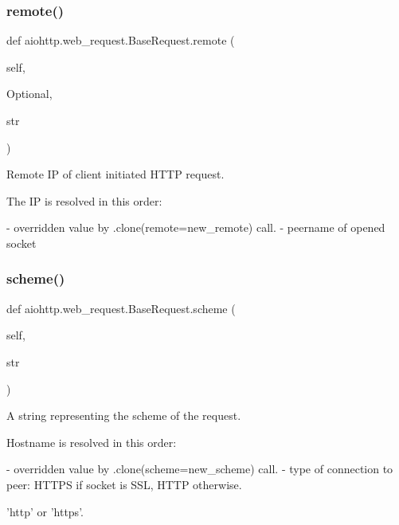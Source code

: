 \subsubsection{\texorpdfstring{remote()}{remote()}}
{\footnotesize\ttfamily def aiohttp.\+web\+\_\+request.\+Base\+Request.\+remote (\begin{DoxyParamCaption}\item[{}]{self,  }\item[{}]{Optional,  }\item[{}]{str }\end{DoxyParamCaption})}

\begin{DoxyVerb}Remote IP of client initiated HTTP request.

The IP is resolved in this order:

- overridden value by .clone(remote=new_remote) call.
- peername of opened socket
\end{DoxyVerb}
 \mbox{\label{classaiohttp_1_1web__request_1_1_base_request_a66c51c7a4b34bd6963a988680caa8c3c}} 
\subsubsection{\texorpdfstring{scheme()}{scheme()}}
{\footnotesize\ttfamily def aiohttp.\+web\+\_\+request.\+Base\+Request.\+scheme (\begin{DoxyParamCaption}\item[{}]{self,  }\item[{}]{str }\end{DoxyParamCaption})}

\begin{DoxyVerb}A string representing the scheme of the request.

Hostname is resolved in this order:

- overridden value by .clone(scheme=new_scheme) call.
- type of connection to peer: HTTPS if socket is SSL, HTTP otherwise.

'http' or 'https'.
\end{DoxyVerb}
 \mbox{\label{classaiohttp_1_1web__request_1_1_base_request_afb50bcce4f35fb74bb3ce6e915301f82}} 
